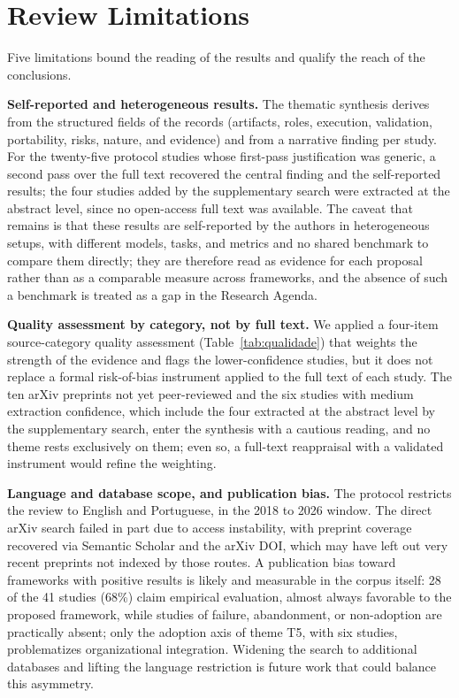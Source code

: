 \section{Review Limitations}

Five limitations bound the reading of the results and qualify the reach of the conclusions.

\noindent\textbf{Self-reported and heterogeneous results.} The thematic synthesis derives from the structured fields of the records (artifacts, roles, execution, validation, portability, risks, nature, and evidence) and from a narrative finding per study. For the twenty-five protocol studies whose first-pass justification was generic, a second pass over the full text recovered the central finding and the self-reported results; the four studies added by the supplementary search were extracted at the abstract level, since no open-access full text was available. The caveat that remains is that these results are self-reported by the authors in heterogeneous setups, with different models, tasks, and metrics and no shared benchmark to compare them directly; they are therefore read as evidence for each proposal rather than as a comparable measure across frameworks, and the absence of such a benchmark is treated as a gap in the Research Agenda.

\noindent\textbf{Quality assessment by category, not by full text.} We applied a four-item source-category quality assessment (Table~\ref{tab:qualidade}) that weights the strength of the evidence and flags the lower-confidence studies, but it does not replace a formal risk-of-bias instrument applied to the full text of each study. The ten arXiv preprints not yet peer-reviewed and the six studies with medium extraction confidence, which include the four extracted at the abstract level by the supplementary search, enter the synthesis with a cautious reading, and no theme rests exclusively on them; even so, a full-text reappraisal with a validated instrument would refine the weighting.

\noindent\textbf{Language and database scope, and publication bias.} The protocol restricts the review to English and Portuguese, in the 2018 to 2026 window. The direct arXiv search failed in part due to access instability, with preprint coverage recovered via Semantic Scholar and the arXiv DOI, which may have left out very recent preprints not indexed by those routes. A publication bias toward frameworks with positive results is likely and measurable in the corpus itself: 28 of the 41 studies (68\%) claim empirical evaluation, almost always favorable to the proposed framework, while studies of failure, abandonment, or non-adoption are practically absent; only the adoption axis of theme T5, with six studies, problematizes organizational integration. Widening the search to additional databases and lifting the language restriction is future work that could balance this asymmetry.

